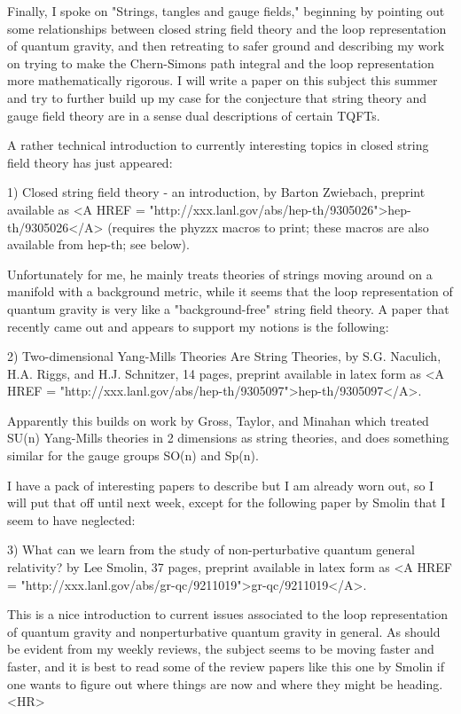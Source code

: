 Finally, I spoke on "Strings, tangles and gauge fields," beginning by
pointing out some relationships between closed string field theory and
the loop representation of quantum gravity, and then retreating to safer
ground and describing my work on trying to make the Chern-Simons path
integral and the loop representation more mathematically rigorous.   I
will write a paper on this subject this summer and try to further build
up my case for the conjecture that string theory and gauge field theory
are in a sense dual descriptions of certain TQFTs.

A rather technical introduction to currently interesting topics in
closed string field theory has just appeared:

1) Closed string field theory - an introduction, by Barton Zwiebach,
preprint available as <A HREF = "http://xxx.lanl.gov/abs/hep-th/9305026">hep-th/9305026</A> (requires the phyzzx macros to print; 
these macros are also available from hep-th; see below).

Unfortunately for me, he mainly treats theories of strings moving around
on a manifold with a background metric, while it seems that the loop
representation of quantum gravity is very like a "background-free"
string field theory.  A paper that recently came out and appears to support 
my notions is the following:

2) Two-dimensional Yang-Mills Theories Are String Theories, by S.G.
Naculich, H.A. Riggs, and H.J. Schnitzer, 14 pages, preprint available
in latex form as <A HREF = "http://xxx.lanl.gov/abs/hep-th/9305097">hep-th/9305097</A>.

Apparently this builds on work by Gross, Taylor, and Minahan which
treated SU(n) Yang-Mills theories in 2 dimensions as string theories,
and does something similar for the gauge groups SO(n) and Sp(n).  




I have a pack of interesting papers to describe but I am already worn
out, so I will put that off until next week, except for the following
paper by Smolin that I seem to have neglected:

3) What can we learn from the study of non-perturbative quantum general
relativity? by Lee Smolin, 37 pages, preprint available in latex form as
<A HREF = "http://xxx.lanl.gov/abs/gr-qc/9211019">gr-qc/9211019</A>.

This is a nice introduction to current issues associated to the loop
representation of quantum gravity and nonperturbative quantum gravity in
general.  As should be evident from my weekly reviews, the subject seems
to be moving faster and faster, and it is best to read some of the
review papers like this one by Smolin if one wants to figure out where
things are now and where they might be heading.
<HR>



